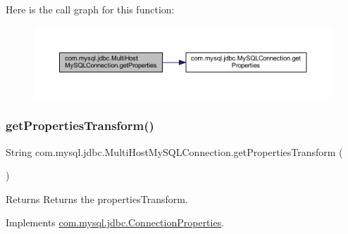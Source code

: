 Here is the call graph for this function\+:
\nopagebreak
\begin{figure}[H]
\begin{center}
\leavevmode
\includegraphics[width=350pt]{classcom_1_1mysql_1_1jdbc_1_1_multi_host_my_s_q_l_connection_a06880fce49c4791eca1bf52761c51ab4_cgraph}
\end{center}
\end{figure}
\mbox{\label{classcom_1_1mysql_1_1jdbc_1_1_multi_host_my_s_q_l_connection_a209788195dbd1e088e7e245bd783fdc0}} 
\subsubsection{\texorpdfstring{get\+Properties\+Transform()}{getPropertiesTransform()}}
{\footnotesize\ttfamily String com.\+mysql.\+jdbc.\+Multi\+Host\+My\+S\+Q\+L\+Connection.\+get\+Properties\+Transform (\begin{DoxyParamCaption}{ }\end{DoxyParamCaption})}

\begin{DoxyReturn}{Returns}
Returns the properties\+Transform. 
\end{DoxyReturn}


Implements \mbox{\hyperlink{interfacecom_1_1mysql_1_1jdbc_1_1_connection_properties_a0d177b2a7b7de4fc521d3362343375de}{com.\+mysql.\+jdbc.\+Connection\+Properties}}.

